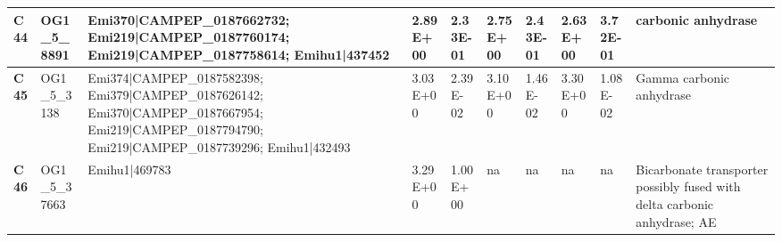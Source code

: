 \begin{landscape}
\begin{center}
\begin{footnotesize}
\begin{longtable}{|p{0.5cm}|p{1.5cm}|p{4cm}|l|l|l|l|l|l|l|}
\textbf{C44} & OG1\_5\_8891  & Emi370|CAMPEP\_0187662732; Emi219|CAMPEP\_0187760174; Emi219|CAMPEP\_0187758614; Emihu1|437452                                                                                                                                                                                                                                                                                                                                                                                                                                                                                                                                           & 2.89E+00  & 2.33E-01 & 2.75E+00  & 2.43E-01 & 2.63E+00  & 3.72E-01 & carbonic anhydrase                                                           \\ \hline
\textbf{C45} & OG1\_5\_3138  & Emi374|CAMPEP\_0187582398; Emi379|CAMPEP\_0187626142; Emi370|CAMPEP\_0187667954; Emi219|CAMPEP\_0187794790; Emi219|CAMPEP\_0187739296; Emihu1|432493                                                                                                                                                                                                                                                                                                                                                                                                                                                                                     & 3.03E+00  & 2.39E-02 & 3.10E+00  & 1.46E-02 & 3.30E+00  & 1.08E-02 & Gamma carbonic anhydrase                                                     \\ \hline
\textbf{C46} & OG1\_5\_37663 & Emihu1|469783                                                                                                                                                                                                                                                                                                                                                                                                                                                                                                                                                                                                                            & 3.29E+00  & 1.00E+00 & na        & na       & na        & na       & Bicarbonate transporter possibly fused with delta carbonic anhydrase; AE     \\ \hline

\end{longtable}
\end{footnotesize}
\end{center}
\end{landscape}
